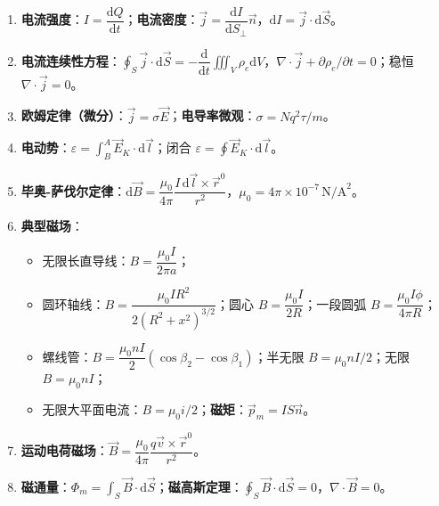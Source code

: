 \documentclass[12pt,a4paper]{ctexart}
\begin{document}
\begin{enumerate}[leftmargin=3em,label=\textbf{公式\arabic*}：,ref=公式\arabic*]

    \item \textbf{电流强度}：$I=\dfrac{\mathrm dQ}{\mathrm dt}$；\textbf{电流密度}：$\vec j=\dfrac{\mathrm dI}{\mathrm dS_\perp}\vec n$，$\mathrm dI=\vec j\cdot\mathrm d\vec S$。

    \item \textbf{电流连续性方程}：$\displaystyle\oint_S\vec j\cdot\mathrm d\vec S=-\dfrac{\mathrm d}{\mathrm dt}\iiint_V\rho_e\mathrm dV$，$\nabla\cdot\vec j+\partial\rho_e/\partial t=0$；稳恒 $\nabla\cdot\vec j=0$。

    \item \textbf{欧姆定律（微分）}：$\vec j=\sigma\vec E$；\textbf{电导率微观}：$\sigma=Nq^2\tau/m$。

    \item \textbf{电动势}：$\varepsilon=\displaystyle\int_B^A\vec E_K\cdot\mathrm d\vec l$；闭合 $\varepsilon=\displaystyle\oint\vec E_K\cdot\mathrm d\vec l$。

    \item \textbf{毕奥-萨伐尔定律}：$\mathrm d\vec B=\dfrac{\mu_0}{4\pi}\dfrac{I\,\mathrm d\vec l\times\vec r^0}{r^2}$，$\mu_0=4\pi\times10^{-7}\,\text{N/A}^2$。

    \item \textbf{典型磁场}：
    \begin{itemize}
        \item 无限长直导线：$B=\dfrac{\mu_0 I}{2\pi a}$；
        \item 圆环轴线：$B=\dfrac{\mu_0 IR^2}{2(R^2+x^2)^{3/2}}$；圆心 $B=\dfrac{\mu_0 I}{2R}$；一段圆弧 $B=\dfrac{\mu_0 I\phi}{4\pi R}$；
        \item 螺线管：$B=\dfrac{\mu_0 nI}{2}(\cos\beta_2-\cos\beta_1)$；半无限 $B=\mu_0 nI/2$；无限 $B=\mu_0 nI$；
        \item 无限大平面电流：$B=\mu_0 i/2$；\textbf{磁矩}：$\vec p_m=IS\vec n$。
    \end{itemize}

    \item \textbf{运动电荷磁场}：$\vec B=\dfrac{\mu_0}{4\pi}\dfrac{q\vec v\times\vec r^0}{r^2}$。

    \item \textbf{磁通量}：$\Phi_m=\displaystyle\int_S\vec B\cdot\mathrm d\vec S$；\textbf{磁高斯定理}：$\displaystyle\oint_S\vec B\cdot\mathrm d\vec S=0$，$\nabla\cdot\vec B=0$。


\end{enumerate}
\end{document}

